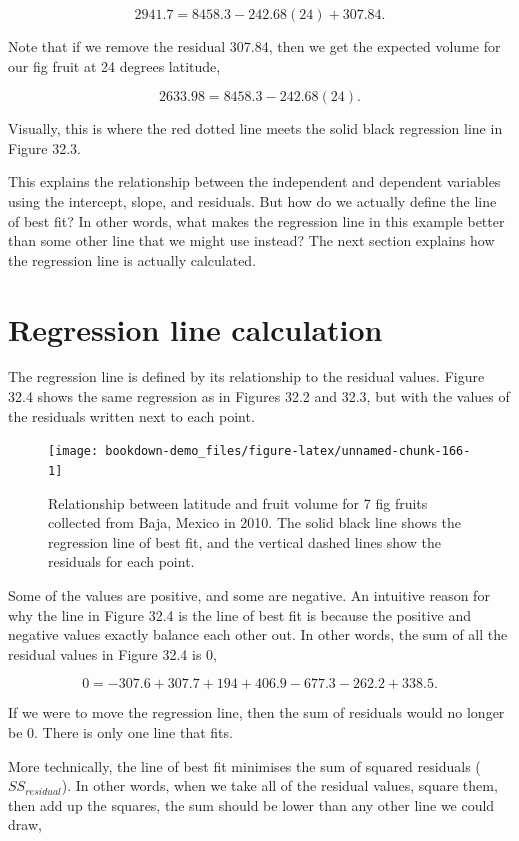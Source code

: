 \documentclass[
]{scrbook}
\begin{document}
\[2941.7 = 8458.3 - 242.68(24) + 307.84.\]

Note that if we remove the residual 307.84, then we get the expected volume for our fig fruit at 24 degrees latitude,

\[2633.98 = 8458.3 - 242.68(24).\]

Visually, this is where the red dotted line meets the solid black regression line in Figure 32.3.

This explains the relationship between the independent and dependent variables using the intercept, slope, and residuals.
But how do we actually define the line of best fit?
In other words, what makes the regression line in this example better than some other line that we might use instead?
The next section explains how the regression line is actually calculated.

\hypertarget{regression-line-calculation}{%
\section{Regression line calculation}\label{regression-line-calculation}}

The regression line is defined by its relationship to the residual values.
Figure 32.4 shows the same regression as in Figures 32.2 and 32.3, but with the values of the residuals written next to each point.

\begin{figure}
\texttt{[image: bookdown-demo\_files/figure-latex/unnamed-chunk-166-1]} \caption{Relationship between latitude and fruit volume for 7 fig fruits collected from Baja, Mexico in 2010. The solid black line shows the regression line of best fit, and the vertical dashed lines show the residuals for each point.}\label{fig:unnamed-chunk-166}
\end{figure}

Some of the values are positive, and some are negative.
An intuitive reason for why the line in Figure 32.4 is the line of best fit is because the positive and negative values exactly balance each other out.
In other words, the sum of all the residual values in Figure 32.4 is 0,

\[0 = -307.6 + 307.7 + 194 + 406.9 - 677.3 - 262.2 + 338.5.\]

If we were to move the regression line, then the sum of residuals would no longer be 0.
There is only one line that fits.

More technically, the line of best fit minimises the sum of squared residuals (\(SS_{residual}\)).
In other words, when we take all of the residual values, square them, then add up the squares, the sum should be lower than any other line we could draw,
\end{document}
